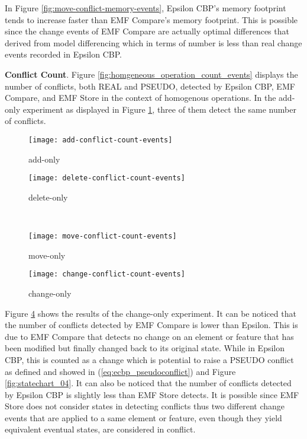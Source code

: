 In Figure \ref{fig:move-conflict-memory-events}, Epsilon CBP's memory footprint tends to increase faster than EMF Compare's memory footprint. This is possible since the change events of EMF Compare are actually optimal differences that derived from model differencing which in terms of number is less than real change events recorded in Epsilon CBP. 

\textbf{Conflict Count}. Figure \ref{fig:homgeneous_operation_count_events} displays the number of conflicts, both \textsf{REAL} and \textsf{PSEUDO}, detected by Epsilon CBP, EMF Compare, and EMF Store in the context of homogenous operations. In the add-only experiment as displayed in Figure \ref{fig:add-conflict-count-events}, three of them detect the same number of conflicts.

\begin{figure*}[ht]
  \centering
  \begin{subfigure}[t]{0.495\linewidth}
    \texttt{[image: add-conflict-count-events]}
    \caption{add-only}
    \label{fig:add-conflict-count-events}
  \end{subfigure}
  \hfill
  \begin{subfigure}[t]{0.495\linewidth}
    \texttt{[image: delete-conflict-count-events]}
    \caption{delete-only}
    \label{fig:delete-conflict-count-events}
  \end{subfigure}
  \\
  \begin{subfigure}[t]{0.495\linewidth}
    \texttt{[image: move-conflict-count-events]}
    \caption{move-only}
    \label{fig:move-conflict-count-events}
  \end{subfigure}
  \hfill
  \begin{subfigure}[t]{0.495\linewidth}
    \texttt{[image: change-conflict-count-events]}
    \caption{change-only}
    \label{fig:change-conflict-count-events}
  \end{subfigure}
  \caption{Conflict detection count for homogeneous operations.}
  \label{fig:homgeneous_operation_count_events}
\end{figure*}

Figure \ref{fig:change-conflict-count-events} shows the results of the change-only experiment. It can be noticed that the number of conflicts detected by EMF Compare is lower than Epsilon. This is due to EMF Compare that detects no change on an element or feature that has been modified but finally changed back to its original state. While in Epsilon CBP, this is counted as a change which is potential to raise a {PSEUDO} conflict as defined and showed in (\ref{eq:ecbp_pseudoconflict}) and Figure \ref{fig:statechart_04}. It can also be noticed that the number of conflicts detected by Epsilon CBP is slightly less than EMF Store detects. It is possible since EMF Store does not consider states in detecting conflicts thus two different change events that are applied to a same element or feature, even though they yield equivalent eventual states, are considered in conflict.

